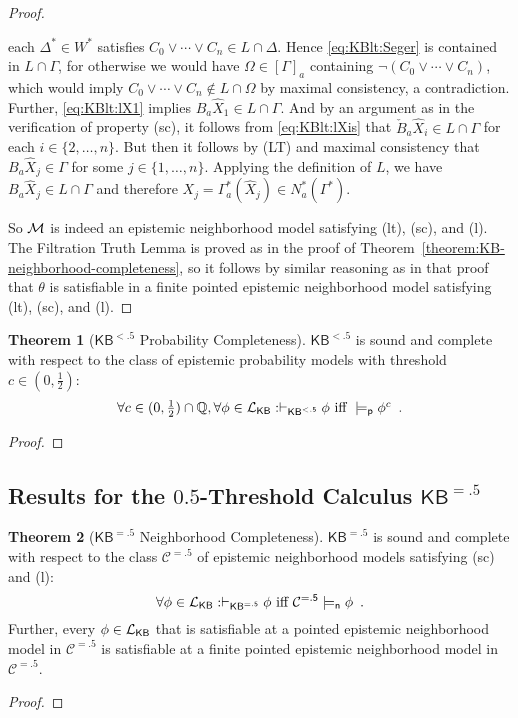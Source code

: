 \documentclass[12pt]{article}
\newcommand{\XXXcomment}[1]{}
\newcommand{\XXXcomment}[1]{\marginpar{\color{blue}{\footnotesize #1}}}
\theoremstyle{definition}
\newtheorem{theorem}{Theorem}[section]
\newcommand{\Rat}{\mathbb{Q}}  %
\newcommand{\M}{{\cal M}}      %
\newcommand{\Lang}{{\cal L}}   %
\newcommand{\KB}{{\mathsf{KB}}}                     %
\newcommand{\KBlt}{{\mathsf{KB}^{\mathsf{<.5}}}}    %
\newcommand{\KBeq}{{\mathsf{KB}^{\mathsf{=.5}}}}    %
\newcommand{\Ceq}{{\mathcal{C}^{\mathsf{=.5}}}}    %
\newcommand{\modelsn}{\models_{\mathsf{n}}}                  %
\newcommand{\modelsp}{\models_{\mathsf{p}}}                  %
\begin{document}
\begin{proof}
\begin{itemize}
    each $\Delta^*\in W^*$ satisfies $C_0\lor\cdots\lor C_n\in
    L\cap\Delta$.  Hence \eqref{eq:KBlt:Seger} is contained in
    $L\cap\Gamma$, for otherwise we would have $\Omega\in[\Gamma]_a$
    containing $\lnot(C_0\lor\cdots\lor C_n)$, which would imply
    $C_0\lor\cdots\lor C_n\notin L\cap\Omega$ by maximal consistency,
    a contradiction.  Further, \eqref{eq:KBlt:lX1} implies $B_a\hat
    X_1\in L\cap\Gamma$.  And by an argument as in the verification of
    property (sc), it follows from \eqref{eq:KBlt:lXis} that $\check
    B_a\hat X_i\in L\cap\Gamma$ for each $i\in\{2,\dots,n\}$.  But
    then it follows by (LT) and maximal consistency that $B_a\hat
    X_j\in\Gamma$ for some $j\in\{1,\dots,n\}$.  Applying the
    definition of $L$, we have $B_a\hat X_j\in L\cap\Gamma$ and
    therefore $X_j=\Gamma^*_a(\hat X_j)\in N^*_a(\Gamma^*)$.
  \end{itemize}
  So $\M$ is indeed an epistemic neighborhood model satisfying (lt),
  (sc), and (l).  The Filtration Truth Lemma is proved as in the proof
  of Theorem~\ref{theorem:KB-neighborhood-completeness}, so it follows
  by similar reasoning as in that proof that $\theta$ is satisfiable
  in a finite pointed epistemic neighborhood model satisfying (lt),
  (sc), and (l).
\end{proof}

\XXXcomment{Not sure about $\KBlt$ probability completeness. --br}


\begin{theorem}[$\KBlt$ Probability Completeness]
  $\KBlt$ is sound and complete with respect to the class of epistemic
  probability models with threshold $c\in(0,\frac 12)$:
  \[
  \textstyle \forall c\in(0,\frac 12)
  \cap\Rat,\forall\phi\in\Lang_\KB: \vdash_\KBlt\phi \text{ iff }
  {}\modelsp\phi^c \enspace.
  \]
\end{theorem}
\begin{proof}
\end{proof}

\subsection{Results for the $0.5$-Threshold Calculus $\KBeq$}

\begin{theorem}[$\KBeq$ Neighborhood Completeness]
  $\KBeq$ is sound and complete with respect to the class $\Ceq$ of
  epistemic neighborhood models satisfying (sc) and (l):
  \[
  \forall\phi\in\Lang_\KB: \vdash_\KBeq\phi \text{ iff }
  \Ceq\modelsn\phi \enspace.
  \]
  Further, every $\phi\in\Lang_\KB$ that is satisfiable at a pointed
  epistemic neighborhood model in $\Ceq$ is satisfiable at a finite
  pointed epistemic neighborhood model in $\Ceq$.
\end{theorem}
\begin{proof}
\end{proof}
\end{document}
